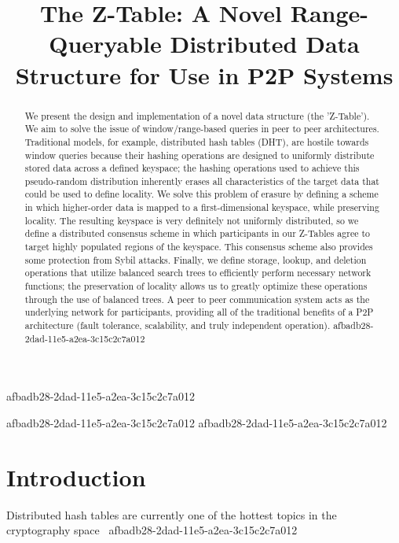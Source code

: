 \documentclass[12pt]{article}
\title{The Z-Table: A Novel Range-Queryable Distributed Data Structure for Use in P2P Systems}
\begin{document}
afbadb28-2dad-11e5-a2ea-3c15c2c7a012\maketitle
afbadb28-2dad-11e5-a2ea-3c15c2c7a012
afbadb28-2dad-11e5-a2ea-3c15c2c7a012\begin{abstract}
We present the design and implementation of a novel data structure (the 'Z-Table'). We aim to solve the issue of window/range-based queries in peer to peer architectures. Traditional models, for example,  distributed hash tables (DHT), are hostile towards window queries because their hashing operations are designed to uniformly distribute stored data across a defined keyspace; the hashing operations used to achieve this pseudo-random distribution inherently erases all characteristics of the target data that could be used to define locality. We solve this problem of erasure by defining a scheme in which higher-order data is mapped to a first-dimensional keyspace, while preserving locality. The resulting keyspace is very definitely not uniformly distributed, so we define a distributed consensus scheme in which participants in our Z-Tables agree to target highly populated regions of the keyspace. This consensus scheme also provides some protection from Sybil attacks. Finally, we define storage, lookup, and deletion operations that utilize balanced search trees to efficiently perform necessary network functions; the preservation of locality allows us to greatly optimize these operations through the use of balanced trees. A peer to peer communication system acts as the underlying network for participants, providing all of the traditional benefits of a P2P architecture (fault tolerance, scalability, and truly independent operation).
afbadb28-2dad-11e5-a2ea-3c15c2c7a012\end{abstract}


\newpage
\section{Introduction}
Distributed hash tables are currently one of the hottest topics in the cryptography space~\cite{Stoica:2001dj,Rowstron:2001ea,Ratnasamy:2001wn}
afbadb28-2dad-11e5-a2ea-3c15c2c7a012
\printbibliography
\end{document}
